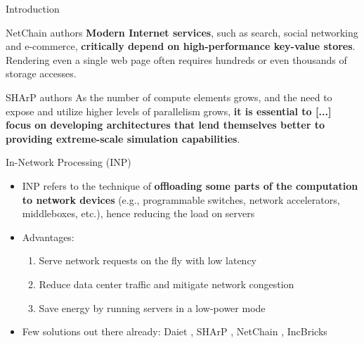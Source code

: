 \begin{frame}[fragile]{Introduction}

    \vspace{5mm}

    \begin{aquote}{NetChain \cite{netchain} authors}
        \textbf{Modern Internet services}, such as search, social networking and e-commerce, \textbf{critically depend on high-performance key-value stores}. Rendering even a single web page often requires hundreds or even thousands of storage accesses.
    \end{aquote}

    \vspace{7mm}

    \begin{aquote}{SHArP \cite{sharp} authors}
        As the number of compute elements grows, and the need to expose and utilize higher levels of parallelism grows, \textbf{it is essential to [...] focus on developing architectures that lend themselves better to providing extreme-scale simulation capabilities}.
    \end{aquote}
\end{frame}

\begin{frame}[fragile]{In-Network Processing (INP)}
    \begin{itemize}
        \item INP refers to the technique of \textbf{offloading some parts of the computation to network devices} (e.g., programmable switches, network accelerators, middleboxes, etc.), hence reducing the load on servers
        \item Advantages:
        \begin{enumerate} %
            \item Serve network requests on the fly with low latency
            \item Reduce data center traffic and mitigate network congestion
            \item Save energy by running servers in a low-power mode
        \end{enumerate}
        \item Few solutions out there already: Daiet \cite{daiet}, SHArP \cite{sharp}, NetChain \cite{netchain}, IncBricks \cite{incbricks}
    \end{itemize}
\end{frame}

